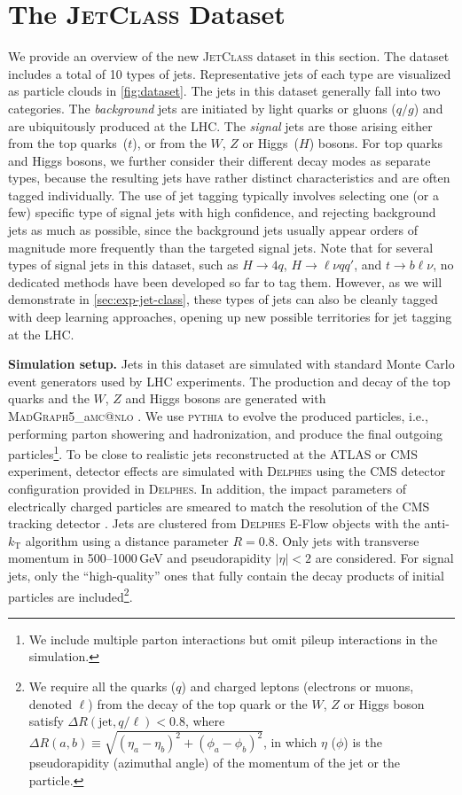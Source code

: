 \documentclass[nohyperref]{article}
\makeatletter
\theoremstyle{plain}
\theoremstyle{definition}
\theoremstyle{remark}
\newcommand{\jetclass}{{\textsc{JetClass}}\xspace}
\newcommand{\hqqqq}{\ensuremath{H\to 4 q}\xspace}
\newcommand{\hlvqq}{\ensuremath{H\to \ell \nu q q'}\xspace}
\newcommand{\tblv}{\ensuremath{t\to b \ell \nu}\xspace}
\newcommand{\qgj}{\ensuremath{q/g}\xspace}
\newcommand{\MADGRAPH}{\textsc{MadGraph}\xspace}
\newcommand{\MCATNLO} {\textsc{mc@nlo}\xspace}
\newcommand{\MGvATNLO}{\MADGRAPH{}5\_a\MCATNLO}
\newcommand{\PYTHIA} {{\textsc{pythia}}\xspace}
\newcommand{\DELPHES} {{\textsc{Delphes}}\xspace}
\makeatother
\begin{document}
\section{The \textsc{JetClass} Dataset}
\label{sec:dataset}

We provide an overview of the new \jetclass dataset in this section. The dataset includes a total of 10 types of jets. 
Representative jets of each type are visualized as particle clouds in \cref{fig:dataset}.
The jets in this dataset generally fall into two categories. 
The \textit{background} jets are initiated by light quarks or gluons (\qgj) and are ubiquitously produced at the LHC. 
The \textit{signal} jets are those arising either from the top quarks~($t$), or from the $W$, $Z$ or Higgs~($H$) bosons. For top quarks and Higgs bosons, we further consider their different decay modes as separate types, because the resulting jets have rather distinct characteristics and are often tagged individually. 
The use of jet tagging typically involves selecting one (or a few) specific type of signal jets with high confidence, and rejecting background jets as much as possible, since the background jets usually appear orders of magnitude more frequently than the targeted signal jets. 
Note that for several types of signal jets in this dataset, such as \hqqqq, \hlvqq, and \tblv, no dedicated methods have been developed so far to tag them. However, as we will demonstrate in \cref{sec:exp-jet-class}, these types of jets can also be cleanly tagged with deep learning approaches, opening up new possible territories for jet tagging at the LHC.

\textbf{Simulation setup.} Jets in this dataset are simulated with standard Monte Carlo event generators used by LHC experiments. The production and decay of the top quarks and the $W$, $Z$ and Higgs bosons are generated with {\MGvATNLO} \cite{Alwall:2014hca}. We use \PYTHIA \cite{Sjostrand:2014zea} to evolve the produced particles, i.e., performing parton showering and hadronization, and produce the final outgoing particles\footnote{We include multiple parton interactions but omit pileup interactions in the simulation.}.
To be close to realistic jets reconstructed at the ATLAS or CMS experiment, detector effects are simulated with \DELPHES \cite{deFavereau:2013fsa} using the CMS detector configuration provided in \DELPHES. In addition, the impact parameters of electrically charged particles are smeared to match the resolution of the CMS tracking detector \cite{CMS:2014pgm}. Jets are clustered from \DELPHES E-Flow objects with the anti-$k_{\text{T}}$ algorithm \cite{Cacciari:2008gp, Cacciari:2011ma} using a distance parameter $R=0.8$. Only jets with transverse momentum in 500--1000\,GeV and pseudorapidity $|\eta|<2$ are considered. For signal jets, only the ``high-quality'' ones that fully contain the decay products of initial particles are included\footnote{We require all the quarks ($q$) and charged leptons (electrons or muons, denoted $\ell$) from the decay of the top quark or the $W$, $Z$ or Higgs boson satisfy $\Delta R(\text{jet}, q/\ell)<0.8$, where $\Delta R(a, b)\equiv\sqrt{(\eta_{a} - \eta_{b})^2 + (\phi_{a} - \phi_{b})^2}$, in which $\eta$ ($\phi$) is the pseudorapidity (azimuthal angle) of the momentum of the jet or the particle.}. 
\end{document}
